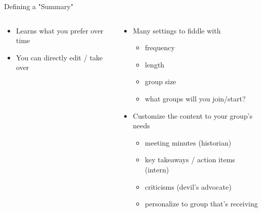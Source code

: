 \documentclass[aspectratio=169]{beamer}
\begin{document}
\begin{frame}{Defining a "Summary"}
\begin{columns}[T]
    \begin{column}[T]{0.5\textwidth}
        \begin{itemize}
            \item Learns what you prefer over time
            \item You can directly edit / take over
        \end{itemize}
    \end{column}
    \begin{column}[T]{0.5\textwidth}
        \begin{itemize}
            \item Many settings to fiddle with
            \begin{itemize}
                \item frequency
                \item length
                \item group size
                \item what groups will you join/start?
            \end{itemize}
            \item Customize the content to your group's needs
            \begin{itemize}
                \item meeting minutes (historian)
                \item key takeaways / action items (intern)
                \item criticisms (devil's advocate)
                \item personalize to group that's receiving
            \end{itemize}
        \end{itemize}
    \end{column}
\end{columns}
\end{frame}
\end{document}
